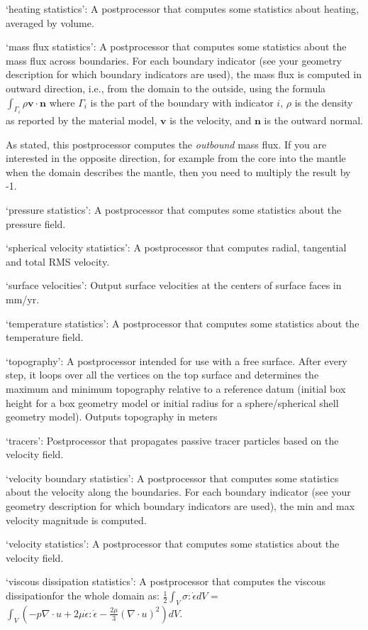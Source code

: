 \begin{itemize}
`heating statistics': A postprocessor that computes some statistics about heating, averaged by volume. 

`mass flux statistics': A postprocessor that computes some statistics about the mass flux across boundaries. For each boundary indicator (see your geometry description for which boundary indicators are used), the mass flux is computed in outward direction, i.e., from the domain to the outside, using the formula $\int_{\Gamma_i} \rho \mathbf v \cdot \mathbf n$ where $\Gamma_i$ is the part of the boundary with indicator $i$, $\rho$ is the density as reported by the material model, $\mathbf v$ is the velocity, and $\mathbf n$ is the outward normal. 

As stated, this postprocessor computes the \textit{outbound} mass flux. If you are interested in the opposite direction, for example from the core into the mantle when the domain describes the mantle, then you need to multiply the result by -1.

`pressure statistics': A postprocessor that computes some statistics about the pressure field.

`spherical velocity statistics': A postprocessor that computes radial, tangential and total RMS velocity.

`surface velocities': Output surface velocities at the centers of surface faces in mm/yr.

`temperature statistics': A postprocessor that computes some statistics about the temperature field.

`topography': A postprocessor intended for use with a free surface.  After every step, it loops over all the vertices on the top surface and determines the maximum and minimum topography relative to a reference datum (initial box height for a box geometry model or initial radius for a sphere/spherical shell geometry model).  Outputs topography in meters

`tracers': Postprocessor that propagates passive tracer particles based on the velocity field.

`velocity boundary statistics': A postprocessor that computes some statistics about the velocity along the boundaries. For each boundary indicator (see your geometry description for which boundary indicators are used), the min and max velocity magnitude is computed.

`velocity statistics': A postprocessor that computes some statistics about the velocity field.

`viscous dissipation statistics': A postprocessor that computes the viscous dissipationfor the whole domain as: $\frac{1}{2} \int_{V} \sigma : \dot{\epsilon}dV$ = $\int_{V} (-p\nabla \cdot u+2\mu\dot{\epsilon}:\dot{\epsilon} - \frac{2\mu}{3}(\nabla\cdot u)^{2}) dV$.


\end{itemize}
